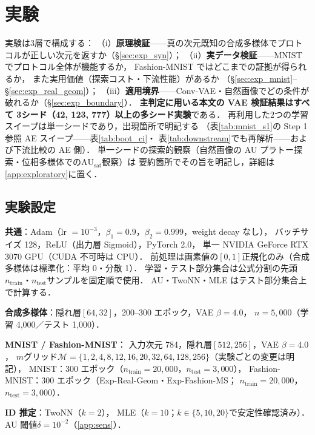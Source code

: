 \documentclass[11pt,a4paper]{jsarticle}
\newcommand{\AUsat}{\mathrm{AU}_{\mathrm{sat}}}
\begin{document}
\section{実験}\label{sec:exp}

実験は3層で構成する：
（i）\textbf{原理検証}——真の次元既知の合成多様体でプロトコルが正しい次元を返すか（§\ref{sec:exp_syn}）；
（ii）\textbf{実データ検証}——MNIST でプロトコル全体が機能するか，
Fashion-MNIST ではどこまでの証拠が得られるか，
また実用価値（探索コスト・下流性能）があるか
（§\ref{sec:exp_mnist}--§\ref{sec:exp_real_geom}）；
（iii）\textbf{適用境界}——Conv-VAE・自然画像でどの条件が破れるか（§\ref{sec:exp_boundary}）．
\textbf{主判定に用いる本文の VAE 検証結果はすべて
3シード（42, 123, 777）以上の多シード実験}である．
再利用した2つの学習スイープは単一シードであり，出現箇所で明記する
（表\ref{tab:mnist_s1}の Step 1 参照 AE スイープ——表\ref{tab:boot_ci}・
表\ref{tab:downstream}でも再解析——および下流比較の AE 側）．
単一シードの探索的観察（自然画像の AU プラトー探索・位相多様体での$\AUsat$観察）は
要約箇所でその旨を明記し，詳細は\ref{app:exploratory}に置く．

\subsection{実験設定}\label{sec:exp_setup}

\textbf{共通}：Adam（lr $= 10^{-3}$，$\beta_1 = 0.9$，$\beta_2 = 0.999$，weight decay なし），
バッチサイズ 128，ReLU（出力層 Sigmoid），PyTorch 2.0，
単一 NVIDIA GeForce RTX 3070 GPU（CUDA 不可時は CPU）．
前処理は画素値の$[0,1]$正規化のみ（合成多様体は標準化：平均 0・分散 1）．
学習・テスト部分集合は公式分割の先頭$n_{\mathrm{train}}$・$n_{\mathrm{test}}$サンプルを固定順で使用．
AU・TwoNN・MLE はテスト部分集合上で計算する．

\textbf{合成多様体}：隠れ層$[64, 32]$，200--300 エポック，VAE $\beta = 4.0$，
$n = 5{,}000$（学習 4,000／テスト 1,000）．

\textbf{MNIST\cite{lecun1998} / Fashion-MNIST\cite{xiao2017fashion}}：
入力次元 784，隠れ層$[512, 256]$，VAE $\beta = 4.0$，
$m$グリッド$\mathcal{M} = \{1, 2, 4, 8, 12, 16, 20, 32, 64, 128, 256\}$（実験ごとの変更は明記），
MNIST：300 エポック（$n_{\mathrm{train}} = 20{,}000$，$n_{\mathrm{test}} = 3{,}000$），
Fashion-MNIST：300 エポック（Exp-Real-Geom・Exp-Fashion-MS；
$n_{\mathrm{train}} = 20{,}000$，$n_{\mathrm{test}} = 3{,}000$）．

\textbf{ID 推定}：TwoNN（$k = 2$）\cite{facco2017twonn}，
MLE（$k = 10$；$k \in \{5, 10, 20\}$で安定性確認済み）\cite{levina2005mle}．
AU 閾値$\delta = 10^{-2}$（\ref{app:sens}）．
\end{document}
